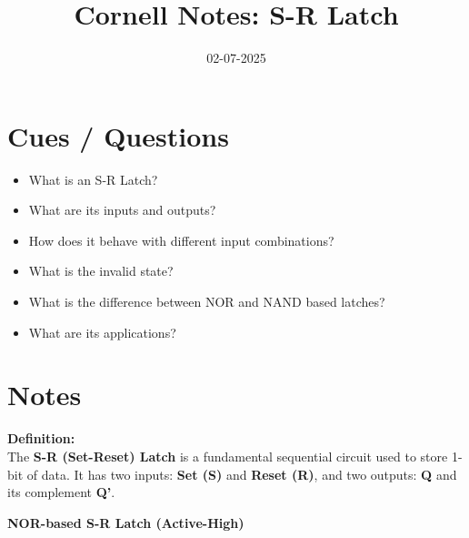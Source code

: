 \documentclass[12pt]{article}
\title{Cornell Notes: S-R Latch}
\date{02-07-2025}
\author{}
\begin{document}
\maketitle

\section*{Cues / Questions}
\begin{itemize}
    \item What is an S-R Latch?
    \item What are its inputs and outputs?
    \item How does it behave with different input combinations?
    \item What is the invalid state?
    \item What is the difference between NOR and NAND based latches?
    \item What are its applications?
\end{itemize}

\section*{Notes}

\textbf{Definition:} \\
The \textbf{S-R (Set-Reset) Latch} is a fundamental sequential circuit used to store 1-bit of data. It has two inputs: \textbf{Set (S)} and \textbf{Reset (R)}, and two outputs: \textbf{Q} and its complement \textbf{Q'}.

\vspace{1em}
\textbf{NOR-based S-R Latch (Active-High)}

\begin{center}
\end{center}
\end{document}
